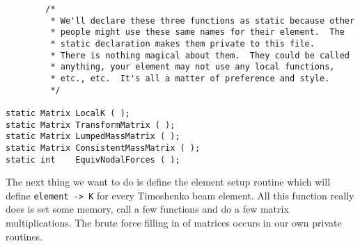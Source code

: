{\begin{screen}
\begin{verbatim}
        /*
         * We'll declare these three functions as static because other
         * people might use these same names for their element.  The
         * static declaration makes them private to this file.
         * There is nothing magical about them.  They could be called
         * anything, your element may not use any local functions,
         * etc., etc.  It's all a matter of preference and style. 
         */

static Matrix LocalK ( );
static Matrix TransformMatrix ( );
static Matrix LumpedMassMatrix ( );
static Matrix ConsistentMassMatrix ( );
static int    EquivNodalForces ( );

 \end{verbatim}
\end{screen}}

The next thing we want to do is define the element setup routine which
will define \mbox{{\tt element -> K}} for every Timoshenko beam element.
All this function really does is set some memory, call a few functions
and do a few matrix multiplications.  The brute force filling in of
matrices occurs in our own private routines. 

